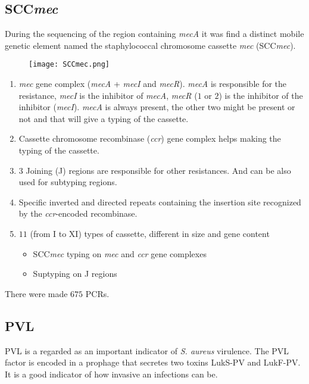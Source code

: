 \subsection{SCC\emph{mec}}

During the sequencing of the region containing \emph{mecA} it was find a distinct mobile genetic element named the staphylococcal chromosome cassette \emph{mec} (SCC\emph{mec}).

\begin{figure}[h]
\centering
\texttt{[image: SCCmec.png]}
\caption{}
\end{figure}

\begin{enumerate}
    \item \emph{mec} gene complex (\emph{mecA} + \emph{mecI} and \emph{mecR}). \emph{mecA} is responsible for the resistance, \emph{mecI} is the inhibitor of \emph{mecA}, \emph{mecR} ($1$ or $2$) is the inhibitor of the inhibitor (\emph{mecI}). \emph{mecA} is always present, the other two might be present or not and that will give a typing of the cassette.
    \item Cassette chromosome recombinase (\emph{ccr}) gene complex helps making the typing of the cassette. 
    \item $3$ Joining (J) regions are responsible for other resistances. And can be also used for subtyping regions. 
    \item Specific inverted and directed repeats containing the insertion site recognized by the \emph{ccr}-encoded recombinase. 
    \item $11$ (from I to XI) types of cassette, different in size and gene content
    \begin{itemize}
        \item SCC\emph{mec} typing on \emph{mec} and \emph{ccr} gene complexes
        \item Suptyping on J regions
    \end{itemize}
\end{enumerate}

There were made $675$ PCRs.

\subsection{PVL}

PVL is a regarded as an important indicator of \emph{S. aureus} virulence. The PVL factor is encoded in a prophage that secretes two toxins LukS-PV and LukF-PV. It is a good indicator of how invasive an infections can be.

